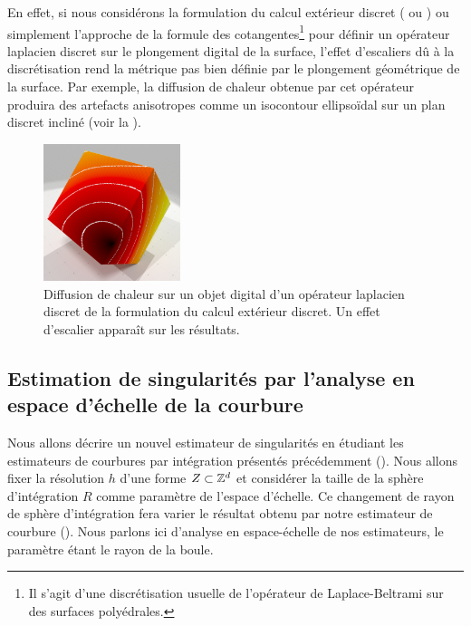 En effet, si nous considérons la formulation du calcul extérieur discret
( ou \DEC) ou simplement l'approche de la
formule des cotangentes\footnote{Il s'agit d'une discrétisation usuelle de
l'opérateur de Laplace-Beltrami sur des surfaces polyédrales.} pour définir un
opérateur laplacien discret sur le plongement digital de la surface, l'effet
d'escaliers dû à la discrétisation rend la métrique pas bien définie par le
plongement géométrique de la surface. Par exemple, la diffusion de chaleur
obtenue par cet opérateur produira des artefacts anisotropes comme un isocontour
ellipsoïdal sur un plan discret incliné (voir la ).
\begin{figure}[ht]{
    \begin{center}
    \includegraphics[width=4cm]{images/Feature/cubeIsoback}
    \end{center}}
    \caption[Problème des méthodes d'analyse spectrales sur des données digitales.]{Diffusion de chaleur sur un objet digital d'un opérateur laplacien discret de la formulation du calcul extérieur discret. Un effet d'escalier apparaît sur les résultats.
      \label{fig:staircase}}
\end{figure}

\subsection{Estimation de singularités par l'analyse en espace d'échelle de la
courbure}%
\label{sec:applications:feature:II}
%
Nous allons décrire un nouvel estimateur de singularités \cite{SMI2015} en
étudiant les estimateurs de courbures par intégration présentés précédemment
(). Nous allons fixer la résolution $h$ d'une
forme $Z \subset \mathbb{Z}^d$ et considérer la taille de la sphère
d'intégration $R$ comme paramètre de l'espace d'échelle. Ce changement de rayon
de sphère d'intégration fera varier le résultat obtenu par notre estimateur de
courbure (). Nous parlons ici d'analyse en
espace-échelle de nos estimateurs, le paramètre étant le rayon de la boule.


